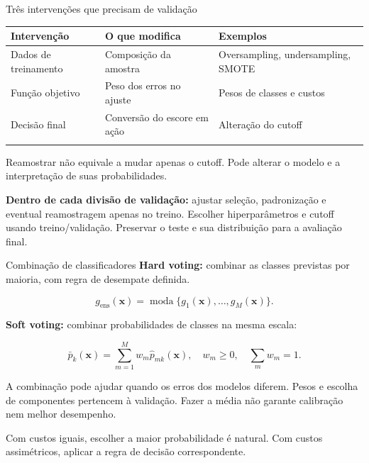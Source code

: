 \documentclass[
  10pt,
  ignorenonframetext,
  aspectratio=169,
  brazilian,
]{beamer}
\newcounter{none} %
\begin{document}
\begin{frame}{Três intervenções que precisam de validação}
\protect{}\label{truxeas-intervenuxe7uxf5es-que-precisam-de-validauxe7uxe3o}
{\def\LTcaptype{none} %
\begin{longtable}[]{@{}
  >{\raggedright\arraybackslash}p{}
  >{\raggedright\arraybackslash}p{}
  >{\raggedright\arraybackslash}p{}@{}}
\toprule\noalign{}
\begin{minipage}[b]{\linewidth}\raggedright
Intervenção
\end{minipage} & \begin{minipage}[b]{\linewidth}\raggedright
O que modifica
\end{minipage} & \begin{minipage}[b]{\linewidth}\raggedright
Exemplos
\end{minipage} \\
\midrule\noalign{}
\endhead
Dados de treinamento & Composição da amostra & Oversampling,
undersampling, SMOTE \\
Função objetivo & Peso dos erros no ajuste & Pesos de classes e
custos \\
Decisão final & Conversão do escore em ação & Alteração do cutoff \\
\bottomrule\noalign{}
\end{longtable}
}

Reamostrar não equivale a mudar apenas o cutoff. Pode alterar o modelo e
a interpretação de suas probabilidades.

\textbf{Dentro de cada divisão de validação:} ajustar seleção,
padronização e eventual reamostragem apenas no treino. Escolher
hiperparâmetros e cutoff usando treino/validação. Preservar o teste e
sua distribuição para a avaliação final.
\end{frame}

\begin{frame}{Combinação de classificadores}
\protect{}\label{combinauxe7uxe3o-de-classificadores}
\textbf{Hard voting:} combinar as classes previstas por maioria, com
regra de desempate definida.

\[
g_{\mathrm{ens}}(\mathbf x)=\operatorname{moda}\{g_1(\mathbf x),\ldots,g_M(\mathbf x)\}.
\]

\textbf{Soft voting:} combinar probabilidades de classes na mesma
escala:

\[
\bar p_k(\mathbf x)=\sum_{m=1}^{M}w_m\hat p_{mk}(\mathbf x),
\quad w_m\geq0,\quad \sum_mw_m=1.
\]

A combinação pode ajudar quando os erros dos modelos diferem. Pesos e
escolha de componentes pertencem à validação. Fazer a média não garante
calibração nem melhor desempenho.

Com custos iguais, escolher a maior probabilidade é natural. Com custos
assimétricos, aplicar a regra de decisão correspondente.
\end{frame}
\end{document}
